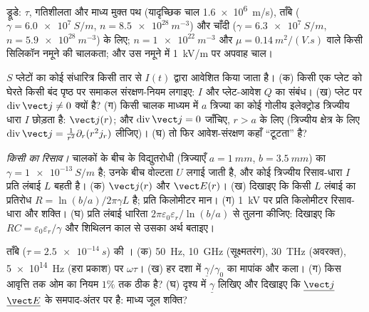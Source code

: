 \begin{exercise}[$\star$]\label{exo:b2:charges-currents-conduction:4}
ड्रूडे: $\tau$, गतिशीलता और माध्य मुक्त पथ (यादृच्छिक चाल \qty{1.6e6}{m/s}),
ताँबे ($\gamma = \qty{6.0e7}{S/m}$, $n = \qty{8.5e28}{m^{-3}}$) और चाँदी
($\gamma = \qty{6.3e7}{S/m}$, $n = \qty{5.9e28}{m^{-3}}$) के लिए;
$n = \qty{1e22}{m^{-3}}$ और $\mu = \qty{0.14}{m^2/(V.s)}$ वाले किसी
सिलिकॉन नमूने की चालकता; और उस नमूने में \qty{1}{kV/m} पर
अपवाह चाल।
\end{exercise}

\begin{exercise}[$\star\star$]\label{exo:b2:charges-currents-conduction:5}
$S$ प्लेटों का कोई संधारित्र किसी तार से $I(t)$ द्वारा आवेशित किया जाता है। (क) किसी एक
प्लेट को घेरते किसी बंद पृष्ठ पर समाकल संरक्षण-नियम लगाइए:
$I$ और प्लेट-आवेश $Q$ का संबंध। (ख) प्लेट पर $\operatorname{div}\vect j \ne 0$
क्यों है? (ग) किसी चालक माध्यम में $a$ त्रिज्या का कोई गोलीय
इलेक्ट्रोड त्रिज्यीय धारा $I$ छोड़ता है: $\vect j(r)$; और $\operatorname{div}
\vect j = 0$ जाँचिए, $r > a$ के लिए (त्रिज्यीय क्षेत्र के लिए $\operatorname{div}\vect j = \frac1{r^2}\partial_r(r^2j_r)$
लीजिए)। (घ) तो फिर आवेश-संरक्षण कहाँ ``टूटता'' है?
\end{exercise}

\begin{exercise}[$\star\star$]\label{exo:b2:charges-currents-conduction:6}
\emph{किसी  का रिसाव।} चालकों के बीच के विद्युतरोधी
(त्रिज्याएँ $a = \qty{1}{mm}$, $b = \qty{3.5}{mm}$) का $\gamma = \qty{1e-13}{S/m}$ है; उनके बीच
वोल्टता $U$ लगाई जाती है, और कोई त्रिज्यीय रिसाव-धारा $I$ प्रति लंबाई $L$ बहती है।
(क) $\vect j(r)$ और $\vect E(r)$। (ख) दिखाइए कि किसी $L$ लंबाई का
प्रतिरोध $R = \ln(b/a)/2\pi\gamma L$ है; प्रति किलोमीटर मान। (ग) \qty{1}{kV} पर प्रति किलोमीटर
रिसाव-धारा और शक्ति।
(घ) प्रति लंबाई धारिता $2\pi\varepsilon_0\varepsilon_r/\ln(b/a)$ से तुलना कीजिए:
दिखाइए कि $RC = \varepsilon_0\varepsilon_r/\gamma$ और शिथिलन काल से उसका अर्थ बताइए।
\end{exercise}

\begin{exercise}[$\star\star$]\label{exo:b2:charges-currents-conduction:7}
ताँबे ($\tau = \qty{2.5e-14}{s}$) की । (क)
\qty{50}{Hz}, \qty{10}{GHz} (सूक्ष्मतरंग), \qty{30}{THz} (अवरक्त), \qty{5e14}{Hz}
(हरा प्रकाश) पर $\omega\tau$। (ख) हर दशा में $\underline\gamma/\gamma_0$ का मापांक और कला।
(ग) किस आवृत्ति तक ओम का नियम $1\%$ तक ठीक है? (घ) दृश्य में
$\underline\gamma$ लिखिए और दिखाइए कि $\underline{\vect j}$ $\underline{\vect E}$ के
समपाद-अंतर पर है: माध्य जूल शक्ति?
\end{exercise}

